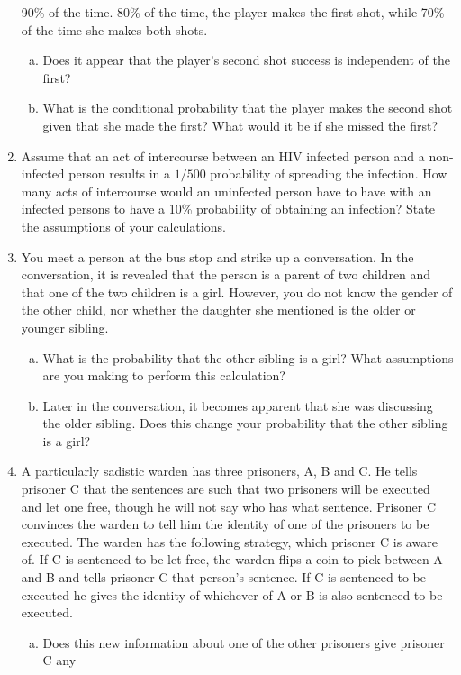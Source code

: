 \documentclass[12pt]{article}
\begin{document}
\begin{enumerate}[Problem 1.]
  90\% of the time. 80\% of the time, the player makes the first shot, while 70\% of the time
  she makes both shots.
\begin{enumerate}[a.]
\item Does it appear that the player's second shot success is independent of the first?
\item What is the conditional probability that the player makes the second shot given that she
  made the first? What would it be if she missed the first?
\end{enumerate}
\item  Assume that an act of intercourse between an HIV infected person
  and a non-infected person results in a $1/500$ probability of
  spreading the infection. How many acts of intercourse would an
  uninfected person have to have with an infected persons to have a
  10\% probability of obtaining an infection?  State the assumptions
  of your calculations.
\item You meet a person at the bus stop and strike up a conversation. In the conversation, it is revealed that the person is a parent of two children and that one of the two children is a girl. However, you do not know the gender of the other child, nor whether the daughter
she mentioned is the older or younger sibling.
\begin{enumerate}[a.]
\item What is the probability that the other sibling is a girl? What assumptions are you making to
perform this calculation?
\item Later in the conversation, it becomes apparent that she was discussing the older sibling.
Does this change your probability that the other sibling is a girl?
\end{enumerate}
\item A particularly sadistic warden has three prisoners, A, B and C. He tells prisoner C
that the sentences are such that two prisoners will be executed and let one free, though he
will not say who has what sentence. Prisoner C convinces the warden to tell
him the identity of one of the prisoners to be executed. The warden has the following strategy, which prisoner C is aware of.  If C is sentenced to be let free, the warden flips a coin to pick between A and B and tells prisoner C that person's sentence. If C is sentenced to be executed he gives the identity of whichever of A or B is also sentenced to be executed.
\begin{enumerate}[a.]
\item Does this new information about one of the other prisoners give prisoner C any

\end{enumerate}
\end{enumerate}
\end{document}
